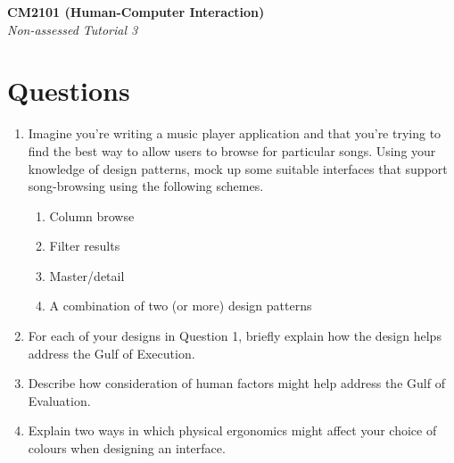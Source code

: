 \documentclass[11pt,a4paper]{report}
\begin{document}
\noindent\Large\textbf{CM2101 (Human-Computer Interaction)}\\
\noindent\large\textit{Non-assessed Tutorial 3}
\vskip30pt

\section*{Questions}

\begin{enumerate}
    \item Imagine you're writing a music player application and that you're trying to find the best way to allow users to browse for particular songs. Using your knowledge of design patterns, mock up some suitable interfaces that support song-browsing using the following schemes.
        \begin{enumerate}
            \item Column browse
            \item Filter results
            \item Master/detail
            \item A combination of two (or more) design patterns
        \end{enumerate}

    \item For each of your designs in Question 1, briefly explain how the design helps address the Gulf of Execution.

    \item Describe how consideration of human factors might help address the Gulf of Evaluation.

    \item Explain two ways in which physical ergonomics might affect your choice of colours when designing an interface. 
\end{enumerate}
\end{document}
